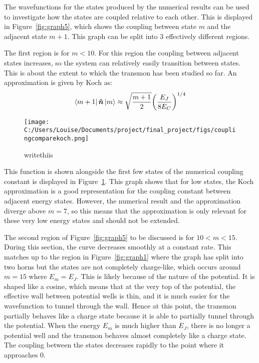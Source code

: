 \documentclass[11pt]{article}
\begin{document}
The wavefunctions for the states produced by the numerical results can be used to investigate how the states are coupled relative to each other. This is displayed in Figure~\ref{fig:graph5}, which shows the coupling between state $m$ and the adjacent state $m+1$. This graph can be split into 3 effectively different regions.

The first region is for $m<10$. For this region the coupling between adjacent states increases, so the system can relatively easily transition between states. This is about the extent to which the transmon has been studied so far. An approximation is given by Koch as:
\begin{equation} \label{eq:10}
\bra{m+1}\boldsymbol{\hat{n}}\ket{m} \approx \sqrt{\frac{m+1}{2}} \bigg( \frac{E_J}{8E_C}\bigg)^{1/4}
\end{equation}
\begin{figure}[ht]
\centering
\texttt{[image: C:/Users/Louise/Documents/project/final\_project/figs/couplingcomparekoch.png]}
\caption{writethiis}
\label{fig:graph7}
\end{figure}
This function is shown alongside the first few states of the numerical coupling constant is displayed in Figure~\ref{fig:graph7}. This graph shows that for low states, the Koch approximation is a good representation for the coupling constant between adjacent energy states. However, the numerical result and the approximation diverge above $m=7$, so this means that the approximation is only relevant for these very low energy states and should not be extended.

The second region of Figure~\ref{fig:graph5} to be discussed is for $10<m<15$. During this section, the curve decreases smoothly at a constant rate. This matches up to the region in Figure~\ref{fig:graph1} where the graph has split into two horns but the states are not completely charge-like, which occurs around $m=15$ where $E_m = E_J$. This is likely because of the nature of the potential. It is shaped like a cosine, which means that at the very top of the potential, the effective wall between potential wells is thin, and it is much easier for the wavefunction to tunnel through the wall. Hence at this point, the transmon partially behaves like a charge state because it is able to partially tunnel through the potential. When the energy $E_m$ is much higher than $E_J$, there is no longer a potential well and the transmon behaves almost completely like a charge state. The coupling between the states decreases rapidly to the point where it approaches 0.
\end{document}
